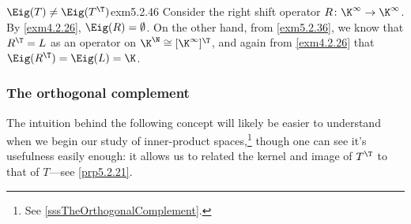 \begin{exm}{$\Eig (T)\neq \Eig (T^{\T})$}{exm5.2.46}
	Consider the right shift operator $R\colon \K ^{\infty}\rightarrow \K ^{\infty}$.  By \cref{exm4.2.26}, $\Eig (R)=\emptyset$.  On the other hand, from \cref{exm5.2.36}, we know that $R^{\T}=L$ as an operator on $\K ^{\N}\cong [\K ^{\infty}]^{\T}$, and again from \cref{exm4.2.26} that $\Eig (R^{\T})=\Eig (L)=\K$.
\end{exm}

\subsubsection{The orthogonal complement}

The intuition behind the following concept will likely be easier to understand when we begin our study of inner-product spaces,\footnote{See \cref{sssTheOrthogonalComplement}.} though one can see it's usefulness easily enough:  it allows us to related the kernel and image of $T^{\T}$ to that of $T$---see \cref{prp5.2.21}.
